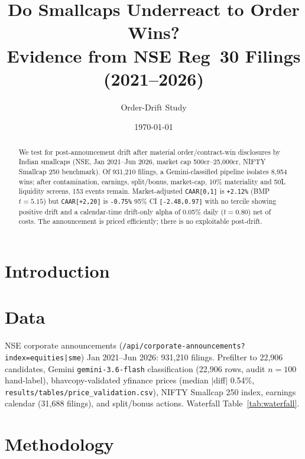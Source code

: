 \documentclass[11pt,a4paper]{article}
\title{Do Smallcaps Underreact to Order Wins?\\ Evidence from NSE Reg~30 Filings (2021--2026)}
\author{Order-Drift Study}
\date{\today}
\newcommand{\rupee}{\text{₹}}
\begin{document}
\maketitle
\begin{abstract}
We test for post-announcement drift after material order/contract-win disclosures by Indian smallcaps (NSE, Jan 2021--Jun 2026, market cap \rupee500cr--\rupee25,000cr, NIFTY Smallcap 250 benchmark). Of 931,210 filings, a Gemini-classified pipeline isolates 8,954 wins; after contamination, earnings, split/bonus, market-cap, 10\% materiality and \rupee50L liquidity screens, 153 events remain. Market-adjusted \texttt{CAAR[0,1]} is \texttt{+2.12\%} (BMP $t=5.15$) but \texttt{CAAR[+2,20]} is \texttt{-0.75\%} 95\% CI \texttt{[-2.48,0.97]} with no tercile showing positive drift and a calendar-time drift-only alpha of 0.05\% daily ($t=0.80$) net of costs. The announcement is priced efficiently; there is no exploitable post-drift.
\end{abstract}

\section{Introduction}
\label{sec:intro}

\section{Data}
\label{sec:data}
NSE corporate announcements (\texttt{/api/corporate-announcements?index=equities|sme}) Jan 2021--Jun 2026: 931,210 filings. Prefilter to 22,906 candidates, Gemini \texttt{gemini-3.6-flash} classification (22,906 rows, audit $n=100$ hand-label), bhavcopy-validated yfinance prices (median $|$diff$|$ 0.54\%, \texttt{results/tables/price\_validation.csv}), NIFTY Smallcap 250 index, earnings calendar (31,688 filings), and split/bonus actions. Waterfall Table~\ref{tab:waterfall}.

\begin{table}[h]
\centering
\caption{Sample construction waterfall (paper Table~1).}
\label{tab:waterfall}

\end{table}

\section{Methodology}
\label{sec:method}

\end{document}
